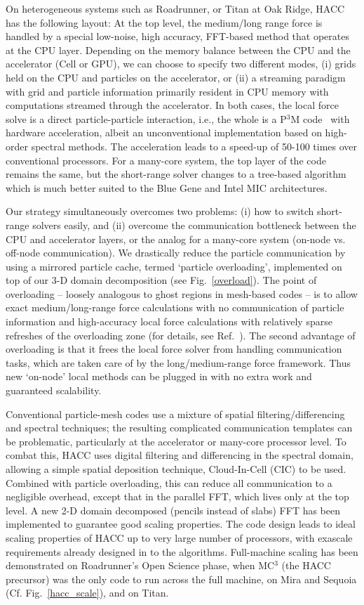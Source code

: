 On heterogeneous systems such as Roadrunner, or Titan at Oak Ridge,
HACC has the following layout: At the top level, the medium/long range
force is handled by a special low-noise, high accuracy, FFT-based
method that operates at the CPU layer. Depending on the memory balance
between the CPU and the accelerator (Cell or GPU), we can choose to
specify two different modes, (i) grids held on the CPU and particles
on the accelerator, or (ii) a streaming paradigm with grid and
particle information primarily resident in CPU memory with
computations streamed through the accelerator. In both cases, the
local force solve is a direct particle-particle interaction, i.e., the
whole is a P$^3$M code~\cite{hockney} with hardware acceleration,
albeit an unconventional implementation based on high-order spectral
methods. The acceleration leads to a speed-up of 50-100 times over
conventional processors.  For a many-core system, the top layer of the
code remains the same, but the short-range solver changes to a
tree-based algorithm which is much better suited to the Blue Gene and
Intel MIC architectures.

Our strategy simultaneously overcomes two problems: (i) how to switch
short-range solvers easily, and (ii) overcome the communication
bottleneck between the CPU and accelerator layers, or the analog for a
many-core system (on-node vs. off-node communication). We drastically
reduce the particle communication by using a mirrored particle cache,
termed `particle overloading', implemented on top of our 3-D domain
decomposition (see Fig.~\ref{overload}). The point of overloading --
loosely analogous to ghost regions in mesh-based codes -- is to allow
exact medium/long-range force calculations with no communication of
particle information and high-accuracy local force calculations with
relatively sparse refreshes of the overloading zone (for details, see
Ref.~\cite{mc3}). The second advantage of overloading is that it frees
the local force solver from handling communication tasks, which are
taken care of by the long/medium-range force framework. Thus new
`on-node' local methods can be plugged in with no extra work and
guaranteed scalability.

Conventional particle-mesh codes use a mixture of spatial
filtering/differencing and spectral techniques; the resulting
complicated communication templates can be problematic, particularly
at the accelerator or many-core processor level. To combat this, HACC
uses digital filtering and differencing in the spectral domain,
allowing a simple spatial deposition technique, Cloud-In-Cell (CIC) to
be used. Combined with particle overloading, this can reduce all
communication to a negligible overhead, except that in the parallel
FFT, which lives only at the top level. A new 2-D domain decomposed
(pencils instead of slabs) FFT has been implemented to guarantee good
scaling properties. The code design leads to ideal scaling properties
of HACC up to very large number of processors, with exascale
requirements already designed in to the algorithms.  Full-machine
scaling has been demonstrated on Roadrunner's Open Science phase, when
MC$^3$ (the HACC precursor) was the only code to run across the full
machine, on Mira and Sequoia (Cf. Fig.~\ref{hacc_scale}), and on
Titan.

